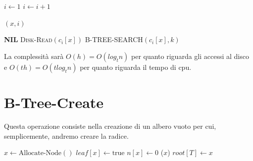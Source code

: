 \begin{algorithm}[H]
\caption{B-TREE-SEARCH($x$, $k$)}
\begin{algorithmic}[1]
    \State $i \gets 1$
     
        \State $i \gets i + 1$
    \EndWhile
    
     
        \State \Return $(x, i)$ 
    \EndIf
    
     
        \State \Return \textbf{NIL} 
    \Else
        \State \textsc{Disk-Read}$(c_i[x])$ 
        \State \Return \textsc{B-TREE-SEARCH}$(c_i[x], k)$ 
    \EndIf
\end{algorithmic}
\end{algorithm}

La complessità sarà $O(h)=O(log_tn)$ per quanto riguarda gli accessi al disco e $O(th)=O(tlog_tn)$ per quanto riguarda il tempo di cpu. \\
\section{B-Tree-Create}
Questa operazione consiste nella creazione di un albero vuoto per cui, semplicemente, andremo creare la radice.
\begin{algorithm}[H]
\caption{B-TREE-INITIALIZE()}
\begin{algorithmic}[1]
    \State $x \gets \text{Allocate-Node}()$ 
    \State $leaf[x] \gets \text{true}$ 
    \State $n[x] \gets 0$ 
    \State {}($x$) 
    \State $root[T] \gets x$ 
\end{algorithmic}
\end{algorithm}
